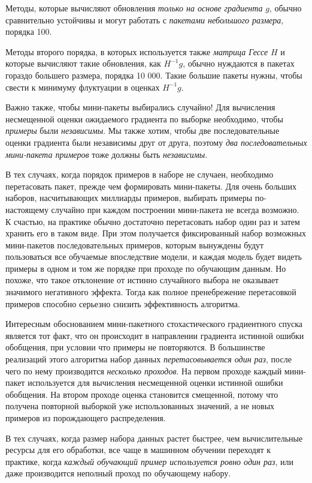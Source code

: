 \documentclass[%
	11pt,
	a4paper,
	utf8,
]{article}
\begin{document}
Методы, которые вычисляют обновления \emph{только на основе градиента} $ g $, обычно сравнительно устойчивы и могут работать с \emph{пакетами небольшого размера}, порядка 100. 

Методы второго порядка, в которых используется также \emph{матрица Гессе} $ H $ и которые вычисляют такие обновления, как $ H^{-1} g $, обычно нуждаются в пакетах гораздо большего размера, порядка 10 000. Такие большие пакеты нужны, чтобы свести к минимуму флуктуации в оценках $ H^{-1} g $.

{\color{blue}Важно также, чтобы мини-пакеты выбирались случайно!} Для вычисления несмещенной оценки ожидаемого градиента по выборке необходимо, чтобы \emph{примеры} были \emph{независимы}. Мы также хотим, чтобы две последовательные оценки градиента были независимы друг от друга, поэтому \emph{два последовательных мини-пакета примеров} тоже должны быть \emph{независимы}.

В тех случаях, когда порядок примеров в наборе не случаен, необходимо перетасовать пакет, прежде чем формировать мини-пакеты. Для очень больших наборов, насчитывающих миллиарды примеров, выбирать примеры по-настоящему случайно при каждом построении мини-пакета не всегда возможно. К счастью, на практике обычно достаточно перетасовать набор один раз и затем хранить его в таком виде. При этом получается фиксированный набор возможных мини-пакетов последовательных примеров, которым вынуждены будут пользоваться все обучаемые впоследствие модели, и каждая модель будет видеть примеры в одном и том же порядке при проходе по обучающим данным. Но похоже, что такое отклонение от истинно случайного выбора не оказывает значимого негативного эффекта. {\color{red}Тогда как полное пренебрежение перетасовкой примеров способно серьезно снизить эффективность алгоритма.}

Интересным обоснованием мини-пакетного стохастического градиентного спуска является тот факт, что он происходит в направлении градиента истинной ошибки обобщения, при условии что примеры не повторяются. В большинстве реализаций этого алгоритма набор данных \emph{перетасовывается один раз}, после чего по нему производится \emph{несколько проходов}. На первом проходе каждый мини-пакет используется для вычисления несмещенной оценки истинной ошибки обобщения. На втором проходе оценка становится смещенной, потому что получена повторной выборкой уже использованных значений, а не новых примеров из порождающего распределения.

В тех случаях, когда размер набора данных растет быстрее, чем вычислительные ресурсы для его обработки, все чаще в машинном обучении переходят к практике, когда \emph{каждый обучающий пример используется ровно один раз}, или даже производится неполный проход по обучающему набору.
\end{document}
